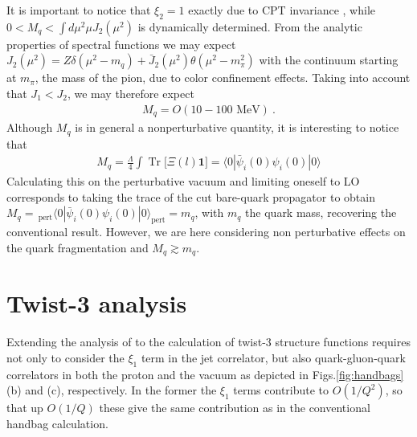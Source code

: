 \documentclass[preprintnumbers,floatfix,nofootinbib]{revtex4}
\newcommand{\todo}[1]{\marginpar{$\bullet$}\textbf{#1}}
\newcommand{\Tr}{\operatorname*{Tr}\nolimits} %
\newcommand{\mj}{M_q}
\newcommand{\mq}{m_q}
\begin{document}
It is important to notice that $\xi_2=1$ exactly due to CPT invariance
\cite{Weinberg:1995mt}, while $0 < \mj < \int d\mu^2 \mu J_2(\mu^2)$ is
dynamically determined. From the analytic properties of spectral functions we
may expect \cite{Accardi:2008ne} $J_2(\mu^2) = Z \delta(\mu^2-m_q) + \bar J_2
(\mu^2) \theta (\mu^2-m_\pi^2)$ with the continuum starting at $m_\pi$, the
mass of the pion, due to color confinement effects. Taking into account that
$J_1 < J_2$, we may therefore expect  
\begin{align}
  \label{eq:mjet}
  \mj = O(10-100 \text{ MeV}) \ .
\end{align}
Although $\mj$ is in general a nonperturbative quantity, it is interesting to
notice that  
\begin{align}
  \label{eq:xi2_chiral_cond}
  \mj = \frac{\Lambda}{4} \int \Tr \big[ \Xi(l) \bm 1] 
   = \langle 0 | \bar \psi_i(0) \psi_i(0) | 0 \rangle
\end{align}
Calculating this on the perturbative vacuum and limiting oneself to LO
corresponds to taking the trace of the cut bare-quark propagator to obtain 
$\mj = \,_{\text{pert}} \langle 0
|  \bar \psi_i(0) \psi_i(0) | 0 \rangle_{\text{pert}}  = \mq$, with $\mq$ the quark mass, recovering the
conventional result. However, we are here considering non perturbative effects
on the quark fragmentation and $\mj \gtrsim \mq$. 

\section{Twist-3 analysis}

Extending the analysis of \cite{Accardi:2008ne} to the calculation of twist-3
structure functions requires not only to consider the $\xi_1$ term in the jet
correlator, but also quark-gluon-quark correlators in both the proton and the
vacuum as depicted in Figs.\ref{fig:handbags}(b) and (c), respectively. 
In the former the $\xi_1$ terms contribute to $O(1/Q^2)$, so that up $O(1/Q)$
these give the same contribution as in the conventional handbag calculation.  
\end{document}
